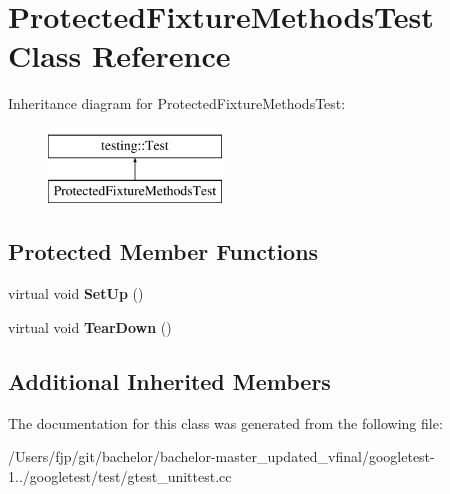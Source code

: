\hypertarget{class_protected_fixture_methods_test}{}\section{Protected\+Fixture\+Methods\+Test Class Reference}
\label{class_protected_fixture_methods_test}
Inheritance diagram for Protected\+Fixture\+Methods\+Test\+:\begin{figure}[H]
\begin{center}
\leavevmode
\includegraphics[height=2.000000cm]{class_protected_fixture_methods_test}
\end{center}
\end{figure}
\subsection*{Protected Member Functions}
\begin{DoxyCompactItemize}
\item 
\mbox{\label{class_protected_fixture_methods_test_a5184c708ac89cfb69f0e4c742e93398a}} 
virtual void {\bfseries Set\+Up} ()
\item 
\mbox{\label{class_protected_fixture_methods_test_aa143dff0a99903cde207b6fd0042c03c}} 
virtual void {\bfseries Tear\+Down} ()
\end{DoxyCompactItemize}
\subsection*{Additional Inherited Members}


The documentation for this class was generated from the following file\+:\begin{DoxyCompactItemize}
\item 
/\+Users/fjp/git/bachelor/bachelor-\/master\+\_\+updated\+\_\+vfinal/googletest-\/1../googletest/test/gtest\+\_\+unittest.\+cc\end{DoxyCompactItemize}
